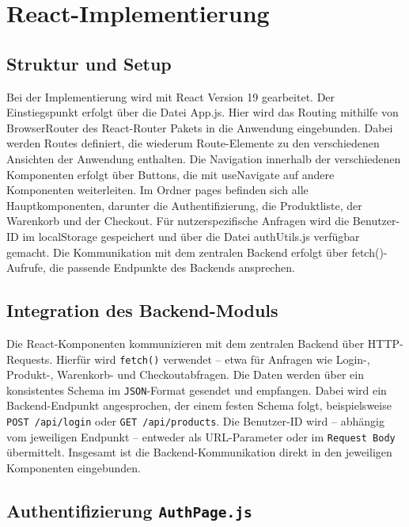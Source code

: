 \documentclass[oneside]{ausarbeitung}
\begin{document}
\section{React-Implementierung}
\subsection{Struktur und Setup}

Bei der Implementierung wird mit React Version 19 gearbeitet. Der Einstiegspunkt erfolgt über die Datei App.js. Hier wird das Routing mithilfe von BrowserRouter des React-Router Pakets in die Anwendung eingebunden. Dabei werden Routes definiert, die wiederum Route-Elemente zu den verschiedenen Ansichten der Anwendung enthalten. Die Navigation innerhalb der verschiedenen Komponenten erfolgt über Buttons, die mit useNavigate auf andere Komponenten weiterleiten. Im Ordner pages befinden sich alle Hauptkomponenten, darunter die Authentifizierung, die Produktliste, der Warenkorb und der Checkout. Für nutzerspezifische Anfragen wird die Benutzer-ID im localStorage gespeichert und über die Datei authUtils.js verfügbar gemacht. Die Kommunikation mit dem zentralen Backend erfolgt über fetch()-Aufrufe, die passende Endpunkte des Backends ansprechen.

\subsection{Integration des Backend-Moduls}

Die React-Komponenten kommunizieren mit dem zentralen Backend über HTTP-Requests. Hierfür wird \texttt{fetch()} verwendet – etwa für Anfragen wie Login-, Produkt-, Warenkorb- und Checkoutabfragen. Die Daten werden über ein konsistentes Schema im \texttt{JSON}-Format gesendet und empfangen.
Dabei wird ein Backend-Endpunkt angesprochen, der einem festen Schema folgt, beispielsweise \texttt{POST /api/login} oder \texttt{GET /api/products}. Die Benutzer-ID wird – abhängig vom jeweiligen Endpunkt – entweder als URL-Parameter oder im \texttt{Request Body} übermittelt.
Insgesamt ist die Backend-Kommunikation direkt in den jeweiligen Komponenten eingebunden.

\subsection{Authentifizierung \texttt{AuthPage.js}} 
\end{document}
